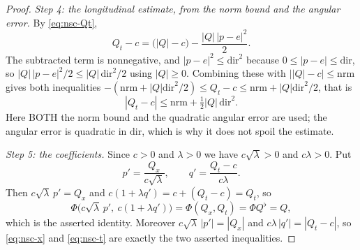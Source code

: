 \begin{proof}
\emph{Step 4: the longitudinal estimate, from the norm bound and the angular error.}
By \eqref{eq:nsc-Qt},
\[
  Q_t-c=\bigl(|Q|-c\bigr)-\frac{|Q|\,|p-e|^2}2 .
\]
The subtracted term is nonnegative, and $|p-e|^2\le\mathrm{dir}^2$ because
$0\le|p-e|\le\mathrm{dir}$, so $|Q|\,|p-e|^2/2\le|Q|\,\mathrm{dir}^2/2$ using
$|Q|\ge0$. Combining these with $\bigl||Q|-c\bigr|\le\mathrm{nrm}$ gives both
inequalities $-(\mathrm{nrm}+|Q|\mathrm{dir}^2/2)\le Q_t-c\le
\mathrm{nrm}+|Q|\mathrm{dir}^2/2$, that is
\begin{equation}\label{eq:nsc-t}
  |Q_t-c|\le\mathrm{nrm}+\tfrac12|Q|\,\mathrm{dir}^2 .
\end{equation}
Here BOTH the norm bound and the quadratic angular error are used; the angular error is
quadratic in $\mathrm{dir}$, which is why it does not spoil the estimate.

\emph{Step 5: the coefficients.}
Since $c>0$ and $\lambda>0$ we have $c\sqrt\lambda>0$ and $c\lambda>0$. Put
\[
  p'=\frac{Q_x}{c\sqrt\lambda},\qquad q'=\frac{Q_t-c}{c\lambda}.
\]
Then $c\sqrt\lambda\,p'=Q_x$ and $c(1+\lambda q')=c+(Q_t-c)=Q_t$, so
\[
  \Phi\bigl(c\sqrt\lambda\,p',\ c(1+\lambda q')\bigr)=\Phi(Q_x,Q_t)=\Phi Q^\flat=Q,
\]
which is the asserted identity. Moreover $c\sqrt\lambda\,|p'|=|Q_x|$ and
$c\lambda\,|q'|=|Q_t-c|$, so \eqref{eq:nsc-x} and \eqref{eq:nsc-t} are exactly the two
asserted inequalities.
\end{proof}

